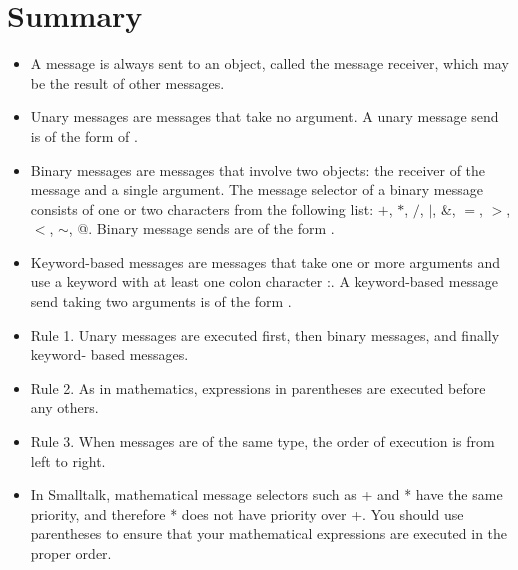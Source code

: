 \documentclass[a4paper,10pt,twoside]{book}
\begin{document}
\section{Summary}

\begin{itemize}
\item  A message is always sent to an object, called the message receiver, which may be the 
result of other messages. 
\item  Unary messages are messages that take no argument. A unary message send is of the 
form of . 
\item  Binary messages are messages that involve two objects: the receiver of the message 
and a single argument. The message selector of a binary message consists of one or two 
characters from the following list: \textsf{$+$}, \textsf{$*$}, \textsf{$/$}, \textsf{$|$}, \textsf{\&}, \textsf{$=$}, \textsf{$>$}, \textsf{$<$}, \textsf{$\sim$}, \textsf{@}. Binary message sends are of 
the form . 
\item  Keyword-based messages are messages that take one or more arguments and use a 
keyword with at least one colon character :. A keyword-based message send taking 
two arguments is of the form . 

\item Rule 1. Unary messages are executed first, then binary messages, and finally keyword- 
based messages. 
\item  Rule 2. As in mathematics, expressions in parentheses are executed before any others. 
\item Rule 3. When messages are of the same type, the order of execution is from left to right. 
\item In Smalltalk, mathematical message selectors such as + and * have the same priority, 
and therefore * does not have priority over +. You should use parentheses to ensure that 
your mathematical expressions are executed in the proper order. 

\end{itemize}

\ifx\wholebook\relax\else
    
\end{document}
